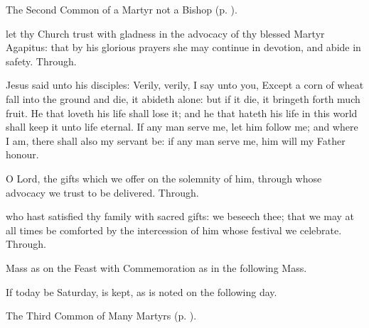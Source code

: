 
\begin{rubric}
	The Second Common of a Martyr not a Bishop (p. \pageref{CommonMartyrNotBishopII}).
\end{rubric}

\collect
{} let thy Church trust with gladness in the advocacy of thy blessed Martyr Agapitus: that by his glorious prayers she may continue in devotion, and abide in safety. Through.

 Jesus said unto his disciples: Verily, verily, I say unto you, Except a corn of wheat fall into the ground and die, it abideth alone: but if it die, it bringeth forth much fruit. He that loveth his life shall lose it; and he that hateth his life in this world shall keep it unto life eternal. If any man serve me, let him follow me; and where I am, there shall also my servant be: if any man serve me, him will my Father honour.

\secret
{} O Lord, the gifts which we offer on the solemnity of him, through whose advocacy we trust to be delivered. Through.


\postcommunion
{} who hast satisfied thy family with sacred gifts: we beseech thee; that we may at all times be comforted by the intercession of him whose festival we celebrate. Through.



\begin{rubric}
	Mass as on the Feast with Commemoration  as in the following Mass.
\end{rubric}
\begin{rubric}
	If today be Saturday,  is kept, as is noted on the following day.
\end{rubric}



\begin{rubric}
	The Third Common of Many Martyrs (p. \pageref{CommonMartyrsIII}).
\end{rubric}

